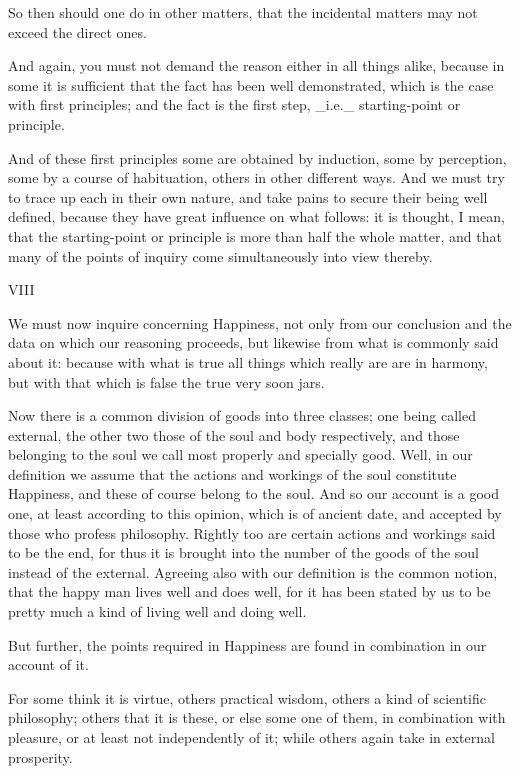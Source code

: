 So then should one do in other matters, that the incidental matters may
not exceed the direct ones.

And again, you must not demand the reason either in all things
alike, because in some it is sufficient that the fact has been well
demonstrated, which is the case with first principles; and the fact is
the first step, _i.e._ starting-point or principle.

And of these first principles some are obtained by induction, some by
perception, some by a course of habituation, others in other different
ways. And we must try to trace up each in their own nature, and take
pains to secure their being well defined, because they have
great influence on what follows: it is thought, I mean, that the
starting-point or principle is more than half the whole matter, and that
many of the points of inquiry come simultaneously into view thereby.


VIII

We must now inquire concerning Happiness, not only from our conclusion
and the data on which our reasoning proceeds, but likewise from what
is commonly said about it: because with what is true all things which
really are are in harmony, but with that which is false the true very
soon jars.

Now there is a common division of goods into three classes; one being
called external, the other two those of the soul and body respectively,
and those belonging to the soul we call most properly and specially
good. Well, in our definition we assume that the actions and workings of
the soul constitute Happiness, and these of course belong to the soul.
And so our account is a good one, at least according to this opinion,
which is of ancient date, and accepted by those who profess philosophy.
Rightly too are certain actions and workings said to be the end, for
thus it is brought into the number of the goods of the soul instead of
the external. Agreeing also with our definition is the common notion,
that the happy man lives well and does well, for it has been stated by
us to be pretty much a kind of living well and doing well.

But further, the points required in Happiness are found in combination
in our account of it.

For some think it is virtue, others practical wisdom, others a kind of
scientific philosophy; others that it is these, or else some one of
them, in combination with pleasure, or at least not independently of it;
while others again take in external prosperity.


